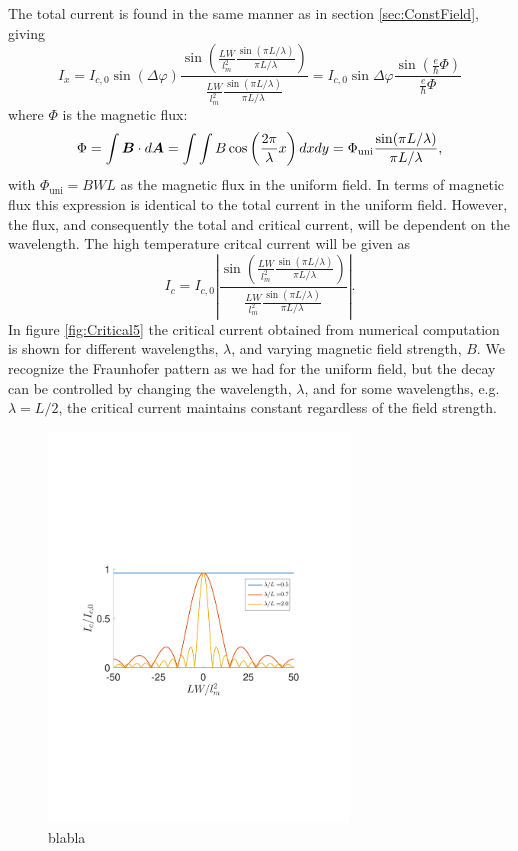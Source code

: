 \\
\\
The total current is found in the same manner as in section  \ref{sec:ConstField}, giving
\begin{equation}
I_x = I_{c,0}\sin(\Delta \varphi)\frac{\sin\left(\frac{LW}{l_m^2}\frac{\sin(\pi L/\lambda)}{\pi L/\lambda}\right)}{\frac{LW}{l_m^2}\frac{\sin(\pi L/\lambda)}{\pi L/\lambda}} = I_{c,0}\sin\Delta\varphi\frac{\sin(\frac{e}{\hbar}\Phi)}{\frac{e}{\hbar}\Phi}
\end{equation}
where $\Phi$ is the magnetic flux:
\begin{equation}
    \Phi = \int \boldsymbol{B}\cdot d\boldsymbol{A} = \int \int B\cos\left(\frac{2\pi}{\lambda}x\right)dxdy = \Phi_{\mathrm{uni}}\frac{\sin(\pi L/\lambda)}{\pi L/\lambda},
\end{equation}
with $\Phi_{\mathrm{uni}} = BWL$ as the magnetic flux in the uniform field. In terms of magnetic flux this expression is identical to the total current in the uniform field. However, the flux, and consequently the total and critical current, will be dependent on the wavelength. The high temperature critcal current will be given as 
\begin{equation}
    I_c = I_{c,0}\left|\frac{\sin\left(\frac{LW}{l_m^2}\frac{\sin(\pi L/\lambda)}{\pi L/\lambda}\right)}{\frac{LW}{l_m^2}\frac{\sin(\pi L/\lambda)}{\pi L/\lambda}}\right|.
\end{equation}
In figure \ref{fig:Critical5} the critical current obtained from numerical computation is shown for different wavelengths, $\lambda$, and varying magnetic field strength, $B$. We recognize the Fraunhofer pattern as we had for the uniform field, but the decay can be controlled by changing the wavelength, $\lambda$, and for some wavelengths, e.g. $\lambda = L/2$, the critical current maintains constant regardless of the field strength.
\begin{figure}[hhh]
\centering
\includegraphics[width=8cm,clip=true,trim=2cm 8cm 3cm 9cm]{fig/Critical5}
\caption{blabla}
\label{fig:critical_phi_pi-2}
\end{figure}

